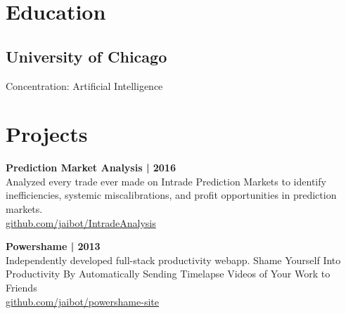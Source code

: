 \documentclass[]{resume}
\begin{document}
%
%
\lastupdated

%
%

%
%

\begin{minipage}[t]{0.33\textwidth} 


\section{Education} 

\subsection{University of Chicago}
Concentration: Artificial Intelligence
\sectionsep


\section{Projects} 

\textbf{Prediction Market Analysis | 2016}\\
Analyzed every trade ever made on Intrade Prediction Markets to identify
inefficiencies, systemic miscalibrations, and profit opportunities in prediction markets.\\
\href{http://github.com/jaibot/IntradeAnalysis}{github.com/jaibot/IntradeAnalysis }
\sectionsep

\textbf{Powershame | 2013} \\
Independently developed full-stack productivity webapp.
Shame Yourself Into Productivity By Automatically Sending Timelapse Videos of Your Work to Friends\\
\href{http://github.com/jaibot/powershame-site}{github.com/jaibot/powershame-site}
\sectionsep


\end{minipage}
\end{document}
